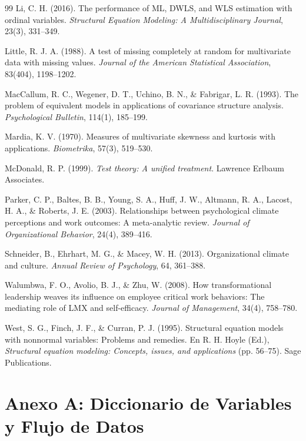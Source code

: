 \documentclass[11pt, a4paper]{article} %
\begin{document}
\begin{thebibliography}{99}
 Li, C. H. (2016). The performance of ML, DWLS, and WLS estimation with ordinal variables. \textit{Structural Equation Modeling: A Multidisciplinary Journal}, 23(3), 331--349.

 Little, R. J. A. (1988). A test of missing completely at random for multivariate data with missing values. \textit{Journal of the American Statistical Association}, 83(404), 1198--1202.

 MacCallum, R. C., Wegener, D. T., Uchino, B. N., \& Fabrigar, L. R. (1993). The problem of equivalent models in applications of covariance structure analysis. \textit{Psychological Bulletin}, 114(1), 185--199.

 Mardia, K. V. (1970). Measures of multivariate skewness and kurtosis with applications. \textit{Biometrika}, 57(3), 519--530.

 McDonald, R. P. (1999). \textit{Test theory: A unified treatment}. Lawrence Erlbaum Associates.

 Parker, C. P., Baltes, B. B., Young, S. A., Huff, J. W., Altmann, R. A., Lacost, H. A., \& Roberts, J. E. (2003). Relationships between psychological climate perceptions and work outcomes: A meta-analytic review. \textit{Journal of Organizational Behavior}, 24(4), 389--416.

 Schneider, B., Ehrhart, M. G., \& Macey, W. H. (2013). Organizational climate and culture. \textit{Annual Review of Psychology}, 64, 361--388.

 Walumbwa, F. O., Avolio, B. J., \& Zhu, W. (2008). How transformational leadership weaves its influence on employee critical work behaviors: The mediating role of LMX and self-efficacy. \textit{Journal of Management}, 34(4), 758--780.

 West, S. G., Finch, J. F., \& Curran, P. J. (1995). Structural equation models with nonnormal variables: Problems and remedies. En R. H. Hoyle (Ed.), \textit{Structural equation modeling: Concepts, issues, and applications} (pp. 56--75). Sage Publications.

\end{thebibliography}

\newpage
\appendix

\section{Anexo A: Diccionario de Variables y Flujo de Datos}
\end{document}
